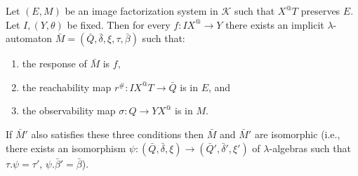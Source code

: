Let $(E, M)$ be an image factorization system in $\mathcal{K}$ such that $X^{@}T$ preserves $E$. Let $I, (Y, \theta)$ be fixed. Then for every $f : IX^{@} \longrightarrow Y$ there exists an implicit $\lambda$-automaton $\bar{M} = (\bar{Q}, \bar{\delta}, \xi, \tau, \bar{\beta})$ such that:
\begin{enumerate}
\item the response of $\bar{M}$ is $f$,
\item the reachability map $r^{\#} : IX^{@}T \longrightarrow \bar{Q}$ is in $E$, and
\item the observability map $\sigma : Q \longrightarrow YX^{@}$ is in $M$.
\end{enumerate}
If $\bar{M}'$ also satisfies these three conditions then $\bar{M}$ and $\bar{M}'$ are isomorphic (i.e., there exists an isomorphism $\psi : (\bar{Q}, \bar{\delta}, \xi) \longrightarrow (\bar{Q}', \bar{\delta}', \xi')$ of $\lambda$-algebras such that $\tau.\psi = \tau'$, $\psi.\bar{\beta}' = \bar{\beta}$).
